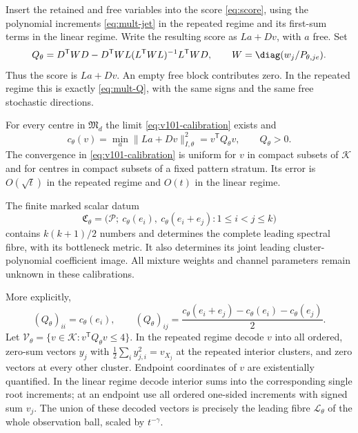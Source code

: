 Insert the retained and free variables into the score
\eqref{eq:score}, using the polynomial increments
\eqref{eq:mult-jet} in the repeated regime and its first-sum terms
in the linear regime. Write the resulting score as $La+Dv$, with $a$ free. Set
\begin{equation}\label{eq:v101-profile-matrix}
 Q_\theta=D^{\mathsf T}WD-D^{\mathsf T}WL
       (L^{\mathsf T}WL)^{-1}L^{\mathsf T}WD,
 \qquad W=\diag(w_j/P_{\theta,je}).
\end{equation}
Thus the score is $La+Dv$. An empty free block contributes zero.
In the repeated regime this is exactly \eqref{eq:mult-Q}, with the
same signs and the same free stochastic directions.

\begin{theorem}\label{thm:v101-finite}
For every centre in $\mathfrak M_d$ the limit
\eqref{eq:v101-calibration} exists and
\begin{equation}\label{eq:v101-calibration-form}
 c_\theta(v)=\min_a\|La+Dv\|_{I,\theta}^2
            =v^{\mathsf T}Q_\theta v,\qquad Q_\theta>0.
\end{equation}
The convergence in \eqref{eq:v101-calibration} is uniform for $v$ in
compact subsets of $\mathcal K$ and for centres in compact subsets of
a fixed pattern stratum. Its error is $O(\sqrt t)$ in the repeated
regime and $O(t)$ in the linear regime.

The finite marked scalar datum
\begin{equation}\label{eq:v101-finite-datum}
 \mathfrak C_\theta=
 \bigl(\mathcal P;\ c_\theta(e_i),\
             c_\theta(e_i+e_j):1\le i<j\le k\bigr)
\end{equation}
contains $k(k+1)/2$ numbers and determines the complete leading
spectral fibre, with its bottleneck metric. It also determines its
joint leading cluster-polynomial coefficient image. All mixture
weights and channel parameters remain unknown in these calibrations.

More explicitly,
\begin{equation}\label{eq:v101-polarization}
 (Q_\theta)_{ii}=c_\theta(e_i),\qquad
 (Q_\theta)_{ij}=\frac{c_\theta(e_i+e_j)-c_\theta(e_i)
                                      -c_\theta(e_j)}2.
\end{equation}
Let $\mathcal V_\theta=\{v\in\mathcal K:v^{\mathsf T}Q_\theta v\le4\}$.
In the repeated regime decode $v$ into all ordered, zero-sum vectors
$y_j$ with $\frac12\sum_i y_{j,i}^2=v_{X_j}$ at the repeated interior
clusters, and zero vectors at every other cluster. Endpoint coordinates
of $v$ are existentially quantified. In the linear regime decode
interior sums into the corresponding single root increments; at an
endpoint use all ordered one-sided increments with signed sum $v_j$.
The union of these decoded vectors is precisely the leading fibre
$\mathcal L_\theta$ of the whole observation ball, scaled by $t^{-\gamma}$.
\end{theorem}

